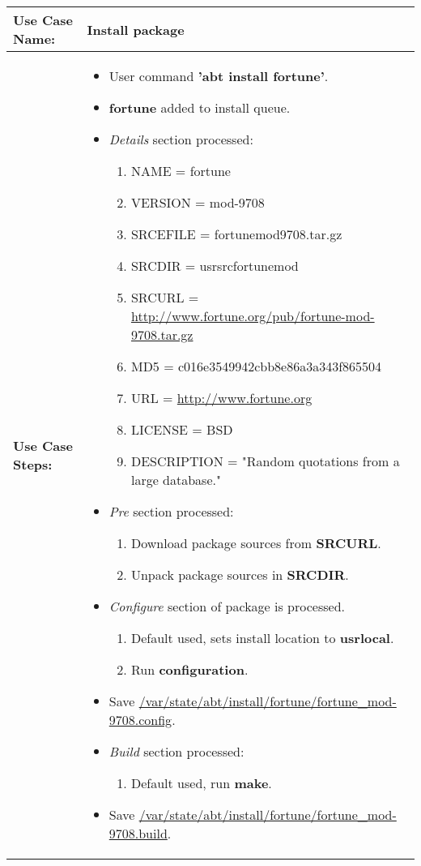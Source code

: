 \medskip

\begin{tabularx}{\linewidth}{|l|X|}
\hline
\textbf{Use Case Name:} & \textbf{Install package} \\
\hline
\textbf{Use Case Steps:} & 
\begin{minipage}{\linewidth} 
  \vspace{0.05em}
  \begin{itemize}
    \item User command \textbf{'abt install fortune'}.
    \item \textbf{fortune} added to install queue.
    \item \emph{Details} section processed:
    \begin{enumerate}
      \item NAME = fortune
      \item VERSION = mod-9708
      \item SRCEFILE = fortune\-mod\-9708.tar.gz
      \item SRCDIR = \/usr\/src\/fortune\-mod\-9708
      \item SRCURL = \url{http://www.fortune.org/pub/fortune-mod-9708.tar.gz}
      \item MD5 = c016e3549942cbb8e86a3a343f865504
      \item URL = \url{http://www.fortune.org}
      \item LICENSE = BSD
      \item DESCRIPTION = "Random quotations from a large database."
    \end{enumerate}
    \item \emph{Pre} section processed:
    \begin{enumerate}
      \item Download package sources from \textbf{SRCURL}.
      \item Unpack package sources in \textbf{SRCDIR}.
    \end{enumerate}
    \item \emph{Configure} section of package is processed.
    \begin{enumerate}
      \item Default used, sets install location to \textbf{\/usr\/local}.
      \item Run \textbf{configuration}.
    \end{enumerate}
    \item Save \url{/var/state/abt/install/fortune/fortune_mod-9708.config}.
    \item \emph{Build} section processed:
    \begin{enumerate}
      \item Default used, run \textbf{make}.
    \end{enumerate}
    \item Save \url{/var/state/abt/install/fortune/fortune_mod-9708.build}.
  \end{itemize}
  \vspace{0.05em}
\end{minipage}
\\
\hline 
\end{tabularx}

